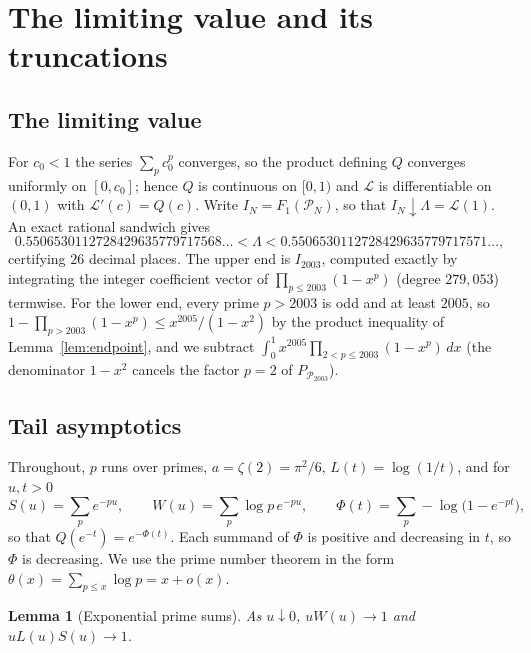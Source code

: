 \documentclass[11pt]{article}
\newtheorem{lemma}[theorem]{Lemma}
\theoremstyle{remark}
\newcommand{\Prm}{\mathcal{P}}
\begin{document}
\section{The limiting value and its truncations}\label{sec:consequences}

\subsection{The limiting value}\label{sec:Lambda}

For $c_0<1$ the series $\sum_pc_0^p$ converges, so the product defining
$Q$ converges uniformly on $[0,c_0]$; hence $Q$ is continuous on $[0,1)$
and $\mathcal L$ is differentiable on $(0,1)$ with
$\mathcal L'(c)=Q(c)$. Write $I_N=F_1(\Prm_N)$, so that
$I_N\downarrow\Lambda=\mathcal L(1)$. An exact rational sandwich gives
\[
  0.5506530112728429635779717568\ldots<\Lambda
  <0.5506530112728429635779717571\ldots,
\]
certifying $26$ decimal places. The upper end is $I_{2003}$, computed
exactly by integrating the integer coefficient vector of
$\prod_{p\le2003}(1-x^p)$ (degree $279{,}053$) termwise. For the lower
end, every prime $p>2003$ is odd and at least $2005$, so
$1-\prod_{p>2003}(1-x^p)\le x^{2005}/(1-x^2)$ by the product inequality
of Lemma~\ref{lem:endpoint}, and we subtract
$\int_0^1x^{2005}\prod_{2<p\le2003}(1-x^p)\,dx$ (the denominator $1-x^2$
cancels the factor $p=2$ of $P_{\Prm_{2003}}$).

\subsection{Tail asymptotics}\label{sec:tailasymp}
Throughout, $p$ runs over primes, $a=\zeta(2)=\pi^2/6$,
$L(t)=\log(1/t)$, and for $u,t>0$
\[
  S(u)=\sum_pe^{-pu},\qquad W(u)=\sum_p\log p\,e^{-pu},\qquad
  \Phi(t)=\sum_p-\log\bigl(1-e^{-pt}\bigr),
\]
so that $Q(e^{-t})=e^{-\Phi(t)}$. Each summand of $\Phi$ is positive and
decreasing in $t$, so $\Phi$ is decreasing. We use the prime number
theorem in the form $\theta(x)=\sum_{p\le x}\log p=x+o(x)$.

\begin{lemma}[Exponential prime sums]\label{lem:expsums}
As $u\downarrow0$, $uW(u)\to1$ and $uL(u)S(u)\to1$.
\end{lemma}
\end{document}
